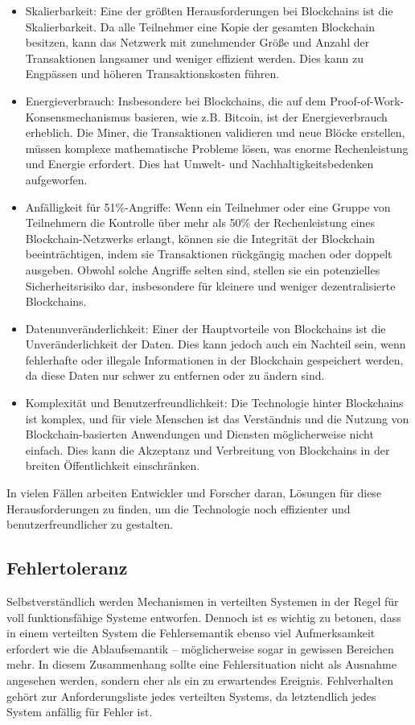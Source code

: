 \documentclass[../vs-script-first-v01.tex]{subfiles}
\begin{document}
\begin{itemize}
\item Skalierbarkeit: Eine der größten Herausforderungen bei Blockchains ist die Skalierbarkeit. Da alle Teilnehmer eine Kopie der gesamten Blockchain besitzen, kann das Netzwerk mit zunehmender Größe und Anzahl der Transaktionen langsamer und weniger effizient werden. Dies kann zu Engpässen und höheren Transaktionskosten führen.
\item Energieverbrauch: Insbesondere bei Blockchains, die auf dem Proof-of-Work-Konsensmechanismus basieren, wie z.B. Bitcoin, ist der Energieverbrauch erheblich. Die Miner, die Transaktionen validieren und neue Blöcke erstellen, müssen komplexe mathematische Probleme lösen, was enorme Rechenleistung und Energie erfordert. Dies hat Umwelt- und Nachhaltigkeitsbedenken aufgeworfen.
\item Anfälligkeit für 51\%-Angriffe: Wenn ein Teilnehmer oder eine Gruppe von Teilnehmern die Kontrolle über mehr als 50\% der Rechenleistung eines Blockchain-Netzwerks erlangt, können sie die Integrität der Blockchain beeinträchtigen, indem sie Transaktionen rückgängig machen oder doppelt ausgeben. Obwohl solche Angriffe selten sind, stellen sie ein potenzielles  Sicherheitsrisiko dar, insbesondere für kleinere und weniger dezentralisierte Blockchains.
\item Datenunveränderlichkeit: Einer der Hauptvorteile von Blockchains ist die Unveränderlichkeit der Daten. Dies kann jedoch auch ein Nachteil sein, wenn fehlerhafte oder illegale Informationen in der Blockchain gespeichert werden, da diese Daten nur schwer zu entfernen oder zu ändern sind.
\item Komplexität und Benutzerfreundlichkeit: Die Technologie hinter Blockchains ist komplex, und für viele Menschen ist das Verständnis und die Nutzung von Blockchain-basierten Anwendungen und Diensten möglicherweise nicht einfach. Dies kann die Akzeptanz und Verbreitung von Blockchains in der breiten Öffentlichkeit einschränken.
\end{itemize}
In vielen Fällen arbeiten Entwickler und Forscher daran, Lösungen für diese Herausforderungen zu finden, um die Technologie noch effizienter und benutzerfreundlicher zu gestalten.

\subsection{Fehlertoleranz}

Selbstverständlich werden Mechanismen in verteilten Systemen in der Regel für voll funktionsfähige Systeme entworfen. Dennoch ist es wichtig zu betonen, dass in einem verteilten System die Fehlersemantik ebenso viel Aufmerksamkeit erfordert wie die Ablaufsemantik – möglicherweise sogar in gewissen Bereichen mehr. In diesem Zusammenhang sollte eine Fehlersituation nicht als Ausnahme angesehen werden, sondern eher als ein zu erwartendes Ereignis. Fehlverhalten gehört zur Anforderungsliste jedes verteilten Systems, da letztendlich jedes System anfällig für Fehler ist.
\end{document}
